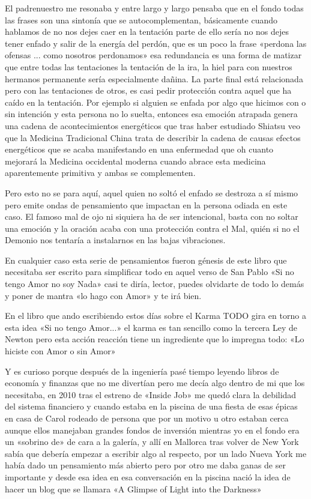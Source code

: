 El padrenuestro me resonaba y entre largo y largo pensaba que en el fondo todas las frases son una sintonía que se autocomplementan, básicamente cuando hablamos de no nos dejes caer en la tentación parte de ello sería no nos dejes tener enfado y salir de la energía del perdón, que es un poco la frase «perdona las ofensas ... como nosotros perdonamos» esa redundancia es una forma de matizar que entre todas las tentaciones la tentación de la ira, la hiel para con nuestros hermanos permanente sería especialmente dañina. La parte final está relacionada pero con las tentaciones de otros, es casi pedir protección contra aquel que ha caído en la tentación. Por ejemplo si alguien se enfada por algo que hicimos con o sin intención y esta persona no lo suelta, entonces esa emoción atrapada genera una cadena de acontecimientos energéticos que tras haber estudiado Shiatsu veo que la Medicina Tradicional China trata de describir la cadena de causas efectos energéticos que se acaba manifestando en una enfermedad que oh cuanto mejorará la Medicina occidental moderna cuando abrace esta medicina aparentemente primitiva y ambas se complementen.

Pero esto no se para aquí, aquel quien no soltó el enfado se destroza a sí mismo pero emite ondas de pensamiento que impactan en la persona odiada en este caso. El famoso mal de ojo ni siquiera ha de ser intencional, basta con no soltar una emoción y la oración acaba con una protección contra el Mal, quién si no el Demonio nos tentaría a instalarnos en las bajas vibraciones. 

En cualquier caso esta serie de pensamientos fueron génesis de este libro que necesitaba ser escrito para simplificar todo en aquel verso de San Pablo «Si no tengo Amor no soy Nada» casi te diría, lector, puedes olvidarte de todo lo demás y poner de mantra «lo hago con Amor» y te irá bien.

En el libro que ando escribiendo estos días sobre el Karma TODO gira en torno a esta idea «Si no tengo Amor...» el karma es tan sencillo como la tercera Ley de Newton pero esta acción reacción tiene un ingrediente que lo impregna todo: «Lo hiciste con Amor o sin Amor» 

Y es curioso porque después de la ingeniería pasé tiempo leyendo libros de economía y finanzas que no me divertían pero me decía algo dentro de mi que los necesitaba, en 2010 tras el estreno de «Inside Job» me quedó clara la debilidad del sistema financiero y cuando estaba en la piscina de una fiesta de esas épicas en casa de Carol rodeado de persona que por un motivo u otro estaban cerca aunque ellos manejaban grandes fondos de inversión mientras yo en el fondo era un «sobrino de» de cara a la galería, y allí en Mallorca tras volver de New York sabía que debería empezar a escribir algo al respecto, por un lado Nueva York me había dado un pensamiento más abierto pero por otro me daba ganas de ser importante y desde esa idea en esa conversación en la piscina nació la idea de hacer un blog que se llamara «A Glimpse of Light into the Darkness»



